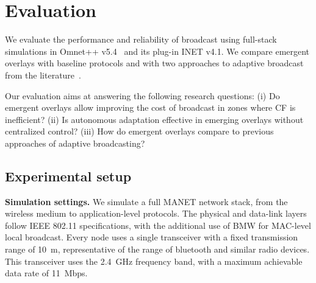 \section{Evaluation}
\label{sec:evaluation}


We evaluate the performance and reliability of broadcast using full-stack simulations in Omnet++ v5.4~\citep{omnet} and its plug-in INET v4.1.
We compare emergent overlays with baseline protocols and with two approaches to adaptive broadcast from the literature~\citep{2001:AAR:876878.879323,adaptive_group_com_iscc02}.

Our evaluation aims at answering the following research questions:
(i) Do emergent overlays allow improving the cost of broadcast in zones where CF is inefficient?
(ii) Is autonomous adaptation effective in emerging overlays without centralized control?
(iii) How do emergent overlays compare to previous approaches of adaptive broadcasting?

\subsection{Experimental setup}

\noindent
\textbf{Simulation settings.}
We simulate a full MANET network stack, from the wireless medium to application-level protocols.
The physical and data-link layers follow IEEE 802.11 specifications, with the additional use of BMW for MAC-level local broadcast.
Every node uses a single transceiver with a fixed transmission range of 10~m, representative of the range of bluetooth and similar radio devices.  
This transceiver uses the 2.4~GHz frequency band, with a maximum achievable data rate of 11~Mbps.

